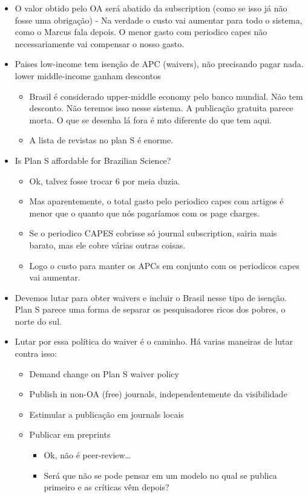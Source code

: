 \documentclass[11pt]{article}
\begin{document}
\begin{itemize}
\begin{itemize}
\begin{itemize}
\item O valor obtido pelo OA será abatido da subscription (como se isso já não fosse uma obrigação) - Na verdade o custo vai aumentar para todo o sistema, como o Marcus fala depois. O menor gasto com periodico capes não necessariamente vai compensar o nosso gasto.
\item Paises low-income tem isenção de APC (waivers), não precisando pagar nada. lower middle-income ganham descontos
\begin{itemize}
\item Brasil é considerado upper-middle economy pelo banco mundial. Não tem desconto. Não teremos isso nesse sistema. A publicação gratuita parece morta. O que se desenha lá fora é mto diferente do que tem aqui.
\item A lista de revistas no plan S é enorme.
\end{itemize}
\item Is Plan S affordable for Brazilian Science?
\begin{itemize}
\item Ok, talvez fosse trocar 6 por meia duzia.
\item Mas aparentemente, o total gasto pelo periodico capes com artigos é menor que o quanto que nós pagaríamos com os page charges.
\item Se o periodico CAPES cobrisse só journal subscription, sairia mais barato, mas ele cobre várias outras coisas.
\item Logo o custo para manter os APCs em conjunto com os periodicos capes vai aumentar.
\end{itemize}
\item Devemos lutar para obter waivers e incluir o Brasil nesse tipo de isenção. Plan S parece uma forma de separar os pesquisadores ricos dos pobres, o norte do sul.
\item Lutar por essa política do waiver é o caminho. Há varias maneiras de lutar contra isso:
\begin{itemize}
\item Demand change on Plan S waiver policy
\item Publish in non-OA (free) journals, independentemente da visibilidade
\item Estimular a publicação em journals locais
\item Publicar em preprints
\begin{itemize}
\item Ok, não é peer-review\ldots{}
\item Será que não se pode pensar em um modelo no qual se publica primeiro e as críticas vêm depois?

\end{itemize}
\end{itemize}
\end{itemize}
\end{itemize}
\end{itemize}
\end{document}

